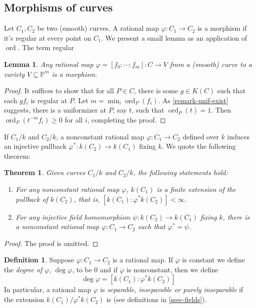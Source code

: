 \documentclass[12pt]{article}
\newtheorem{theorem}{Theorem}[subsection]
\newtheorem{lemma}{Lemma}[subsection]
\theoremstyle{remark}
\theoremstyle{definition}
\newtheorem{definition}{Definition}[subsection]
\newcommand{\ord}[0]{\operatorname{ord}}
\begin{document}
    \subsection{Morphisms of curves}
        Let $C_1, C_2$ be two (smooth) curves. A rational map $\varphi: C_1\to C_2$ is a morphism if it's regular at every point on $C_1$. We present a small lemma as an application of $\ord$. The term regular 
        \begin{lemma}
            Any rational map $\varphi=[f_0:\cdots:f_m]:C\to V$ from a (smooth) curve to a variety $V\subseteq \mathbb P^m$ is a morphism.
        \end{lemma}
        \begin{proof}
            It suffices to show that for all $P\in C$, there is some $g\in K(C)$ such that each $gf_i$ is regular at $P$. Let $m=\min_{i}\ord_P(f_i)$. As \autoref{remark-unif-exist} suggests, there is a uniformizer at $P$, say $t$, such that $\ord_P(t)=1$. Then $\ord_P( t^{-m}f_i)\geqslant 0$ for all $i$, completing the proof.
        \end{proof}
        If $C_1/k$ and $C_2/k$, a nonconstant rational map $\varphi:C_1\to C_2$ defined over $k$ induces an injective pullback $\varphi^*:k(C_2)\to k(C_1)$ fixing $k$. We quote the following theorem:
        \begin{theorem}\label{theorem-map-fin}
            Given curves $C_1/k$ and $C_2/k$, the following statements hold:
            \begin{enumerate}[\normalfont(i)]
                \item For any nonconstant rational map $\varphi$, $k(C_1)$ is a finite extension of the pullback of $k(C_2)$, that is, $[k(C_1):\varphi^*k(C_2)]<\infty$.
                \item For any injective field homomorphism $\psi:k(C_2)\to k(C_1)$ fixing $k$, there is a nonconstant rational map $\varphi:C_1\to C_2$ such that $\varphi^*=\psi$.
            \end{enumerate}
        \end{theorem}
        \begin{proof}
            The proof is omitted.
        \end{proof}
        \begin{definition}
            Suppose $\varphi:C_1\to C_2$ is a rational map. If $\varphi$ is constant we define the \textit{degree of $\varphi$}, $\deg\varphi$, to be $0$ and if $\varphi$ is nonconstant, then we define
            \[\deg\varphi=[k(C_1):\varphi^*k(C_2)]\]
            In particular, a rational map $\varphi$ is \textit{separable, inseparable or purely inseparable} if the extension $k(C_1)/\varphi^*k(C_2)$ is (see definitions in \autoref{ssec-fields}).
        \end{definition}
\end{document}
